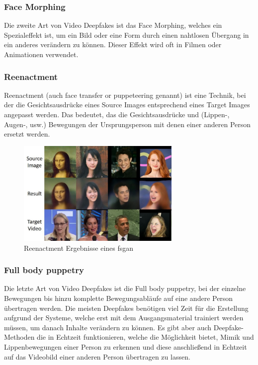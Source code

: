 \subsubsection*{Face Morphing}
Die zweite Art von Video Deepfakes ist das Face Morphing, welches ein Spezialeffekt ist, um ein Bild oder eine Form durch einen nahtlosen Übergang in ein anderes verändern zu können. Dieser Effekt wird oft in Filmen oder Animationen verwendet.\cite{ResearchGate}

\subsubsection*{Reenactment}
Reenactment (auch face transfer or puppeteering genannt) ist eine Technik, bei der die Gesichtsausdrücke eines
Source Images entsprechend eines Target Images angepasst werden.
Das bedeutet, das die Gesichtsausdrücke und (Lippen-, Augen-, usw.) Bewegungen der Ursprungsperson mit denen einer
anderen Person ersetzt werden.
\begin{figure}[h]
    \includegraphics[width=0.7\textwidth]{Bilder/Reenactment}
    \centering
    \caption{Reenactment Ergebnisse eines \gls{fsgan}\cite{face-swapping-and-reenactment}}
    \label{fig:reenactment-fsgan}
\end{figure}

\subsubsection*{Full body puppetry}
Die letzte Art von Video Deepfakes ist die Full body puppetry, bei der einzelne Bewegungen bis hinzu komplette
Bewegungsabläufe auf eine andere Person übertragen werden.\newline
Die meisten Deepfakes benötigen viel Zeit für die Erstellung aufgrund der Systeme, welche erst mit dem Ausgangsmaterial trainiert werden müssen, um danach Inhalte verändern zu können.
Es gibt aber auch Deepfake-Methoden die in Echtzeit funktionieren, welche die Möglichkeit bietet, Mimik und Lippenbewegungen einer Person zu erkennen und diese anschließend in Echtzeit auf das Videobild einer anderen Person übertragen zu lassen.\cite{ResearchGate}

